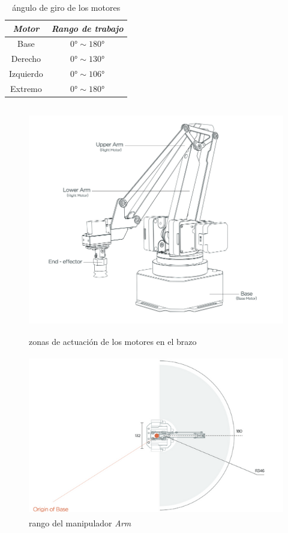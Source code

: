 \documentclass[a4paper,12pt]{article}
\begin{document}
\begin{table}[ht]
    \centering
    \begin{tabular}{||c | c||}
        \hline
        \textit{Motor} & \textit{Rango de trabajo} \\ [0.5ex]
        \hline\hline
        Base & $\ang{0} \sim \ang{180}$ \\
        \hline
        Derecho & $\ang{0} \sim \ang{130}$ \\
        \hline
        Izquierdo & $\ang{0} \sim \ang{106}$ \\
        \hline
        Extremo & $\ang{0} \sim \ang{180}$ \\ [1ex]
        \hline
    \end{tabular}
    \caption{ángulo de giro de los motores}
\end{table}

\begin{figure}[ht]
    \centering
    \includegraphics[height=10cm]{images/motors.png}
    \caption{zonas de actuación de los motores en el brazo \cite{developer_guide_uarm}}
    \label{fig:motors}
\end{figure}

\begin{figure}[H]
    \centering
    \includegraphics[height=7cm]{images/range.png}
    \caption{rango del manipulador \emph{{\textmu}Arm} \cite{user_manual_uarm}}
    \label{fig:range}
\end{figure}
\end{document}
